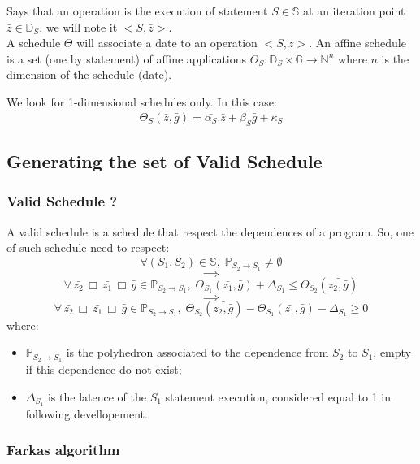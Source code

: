 	Says  that an operation is the execution of statement $S \in \mathbb{S}$ at an iteration point 
$\bar{z} \in \mathbb{D}_{S}$, we will note it $<\!S, \bar{z}\!>$.\\
	A schedule $\Theta$ will associate a date to an operation $<\!S, \bar{z}\!>$. An affine schedule is a set (one
by statement) of affine applications $\Theta_{S}: \mathbb{D}_{S} \times \mathbb{G} \rightarrow \mathbb{N}^{n}$ where $n$
is the dimension of the schedule (date).

	We look for 1-dimensional schedules only. In this case:
$$\Theta_{S}(\bar{z}, \bar{g}) = \bar{\alpha_{S}} . \bar{z} + \bar{\beta_{S}} \bar{g} + \kappa_{S}$$

		\subsection{Generating the set of Valid Schedule}
		\label{polyhedric:schedule:vss}

			\subsubsection{Valid Schedule ?}
			\label{polyhedric:schedule:vss:vss}
			
	A valid schedule is a schedule that respect the dependences of a program. So, one of such schedule need to respect:
	$$ \forall (S_{1}, S_{2}) \in \mathbb{S}, \; \mathbb{P}_{S_{2} \rightarrow S_{1}} \neq \emptyset $$
	$$ \implies $$
	$$ \forall \, \bar{z_{2}} \,\Box\, \bar{z_{1}} \,\Box\, \bar{g} \in \mathbb{P}_{S_{2} \rightarrow S_{1}}, \; 
	\Theta_{S_{1}}(\bar{z_{1}}, \bar{g}) + \Delta_{S_{1}} \leq \Theta_{S_{2}}(\bar{z_{2}, \bar{g}}) $$
	$$ \implies $$
	$$ \forall \, \bar{z_{2}} \,\Box\, \bar{z_{1}} \,\Box\, \bar{g} \in \mathbb{P}_{S_{2} \rightarrow S_{1}}, \; 
	\Theta_{S_{2}}(\bar{z_{2}, \bar{g}}) - \Theta_{S_{1}}(\bar{z_{1}}, \bar{g}) - \Delta_{S_{1}} \geq 0 $$
	where:
\begin{itemize}
	\item $ \mathbb{P}_{S_{2} \rightarrow S_{1}} $ is the polyhedron associated to the dependence from $S_{2}$ to $S_{1}$,
	empty if this dependence do not exist;
	\item $ \Delta_{S_{1}} $ is the latence of the $S_{1}$ statement execution, considered equal to 1 in following
	devellopement.
\end{itemize}

			\subsubsection{Farkas algorithm}
			\label{polyhedric:schedule:vss:farkas}

